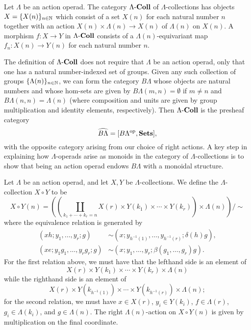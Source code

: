 \begin{Defi}
Let $\Lambda$ be an action operad. The category $\Lambda\mathbf{\mbox{-}Coll}$ of $\Lambda$-collections has objects $X = \{ X(n) \}_{n \in \mathbb{N}}$ which consist of a set $X(n)$ for each natural number $n$ together with an action $X(n) \times \Lambda(n) \rightarrow X(n)$ of $\Lambda(n)$ on $X(n)$. A morphism $f \colon X \rightarrow Y$ in $\Lambda\mathbf{\mbox{-}Coll}$ consists of a $\Lambda(n)$-equivariant map $f_{n} \colon X(n) \rightarrow Y(n)$ for each natural number $n$.
\end{Defi}

\begin{rem}
The definition of $\Lambda\mathbf{\mbox{-}Coll}$ does not require that $\Lambda$ be an action operad, only that one has a natural number-indexed set of groups. Given any such collection of groups $\{ \Lambda(n) \}_{n \in \mathbb{N}}$, we can form the category $B\Lambda$ whose objects are natural numbers and whose hom-sets are given by $B\Lambda(m,n) = \emptyset$ if $m \neq n$ and $B\Lambda(n,n) = \Lambda(n)$ (where composition and units are given by group multiplication and identity elements, respectively). Then $\Lambda\mathbf{\mbox{-}Coll}$ is the presheaf category
  \[
    \widehat{B\Lambda} = [B\Lambda^{\textrm{op}}, \mathbf{Sets}],
  \]
with the opposite category arising from our choice of right actions. A key step in explaining how $\Lambda$-operads arise as monoids in the category of $\Lambda$-collections is to show that being an action operad endows $B\Lambda$ with a monoidal structure.
\end{rem}

\begin{Defi}
Let $\Lambda$ be an action operad, and let $X, Y$ be $\Lambda$-collections. We define the $\Lambda$-collection $X \circ Y$ to be
  \[
    X \circ Y (n) = \left(\left( \coprod_{k_{1} + \cdots + k_{r} = n} X(r) \times Y(k_{1}) \times \cdots \times Y(k_{r}) \right) \times \Lambda(n)\right) / \sim
  \]
where the equivalence relation is generated by
  \begin{align*}
    \left(xh; y_{1}, \ldots, y_{r}; g\right) &\sim \left(x; y_{h^{-1}(1)}, \ldots, y_{h^{-1}(r)}; \delta(h)g\right), \\
    \left(xe; y_{1}g_{1}, \ldots, y_{r}g_{r}; g\right) &\sim \left(x; y_{1}, \ldots, y_{r}; \beta(g_{1}, \ldots, g_{r})g\right).
  \end{align*}
For the first relation above, we must have that the lefthand side is an element of
  \[
    X(r) \times Y(k_1) \times \cdots \times Y(k_r) \times \Lambda(n)
  \]
while the righthand side is an element of
  \[
    X(r) \times Y\left(k_{h^{-1}(1)}\right) \times \cdots \times Y\left(k_{h^{-1}(r)}\right) \times \Lambda(n);
  \]
for the second relation, we must have $x \in X(r)$, $y_{i} \in Y(k_{i})$, $f \in \Lambda(r)$, $g_{i} \in \Lambda(k_{i})$, and $g \in \Lambda(n)$. The right $\Lambda(n)$-action on $X \circ Y(n)$ is given by multiplication on the final coordinate.
\end{Defi}


